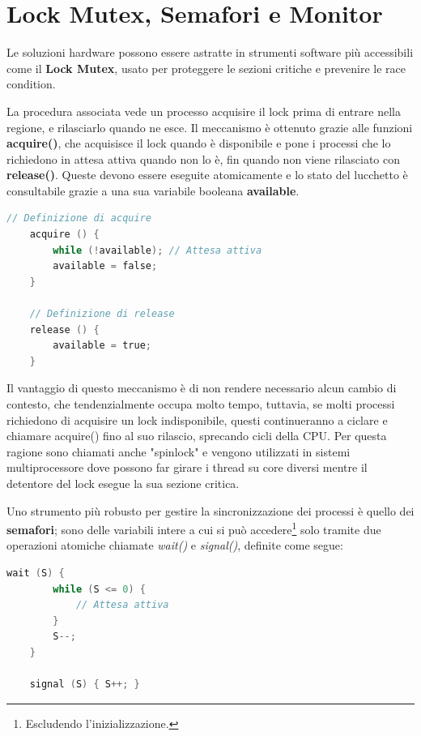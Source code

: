 \section{Lock Mutex, Semafori e Monitor}
Le soluzioni hardware possono essere astratte in strumenti software più accessibili come il \textbf{Lock Mutex}, usato per proteggere le sezioni
critiche e prevenire le race condition.\par
La procedura associata vede un processo acquisire il lock prima di entrare nella regione, e rilasciarlo quando ne esce. Il meccanismo è ottenuto grazie
alle funzioni \textbf{acquire()}, che acquisisce il lock quando è disponibile e pone i processi che lo richiedono in attesa attiva quando non lo è, fin
quando non viene rilasciato con \textbf{release()}. Queste devono essere eseguite atomicamente e lo stato del lucchetto è consultabile grazie a una sua
variabile booleana \textbf{available}.
\begin{lstlisting}[language=C]
    // Definizione di acquire
    acquire () {
        while (!available); // Attesa attiva
        available = false;
    }

    // Definizione di release
    release () {
        available = true;
    }
\end{lstlisting}

\noindent Il vantaggio di questo meccanismo è di non rendere necessario alcun cambio di contesto, che tendenzialmente occupa molto tempo, tuttavia, se
molti processi richiedono di acquisire un lock indisponibile, questi continueranno a ciclare e chiamare acquire() fino al suo rilascio, sprecando cicli
della CPU. Per questa ragione sono chiamati anche "spinlock" e vengono utilizzati in sistemi multiprocessore dove possono far girare i thread su core
diversi mentre il detentore del lock esegue la sua sezione critica.\par
Uno strumento più robusto per gestire la sincronizzazione dei processi è quello dei \textbf{semafori}; sono delle variabili intere a cui si può
accedere\footnote{Escludendo l'inizializzazione.} solo tramite due operazioni atomiche chiamate \textit{wait()} e \textit{signal()}, definite come segue:
\begin{lstlisting}[language=C]
    wait (S) {
        while (S <= 0) {
            // Attesa attiva
        }
        S--;
    }

    signal (S) { S++; }
\end{lstlisting}

